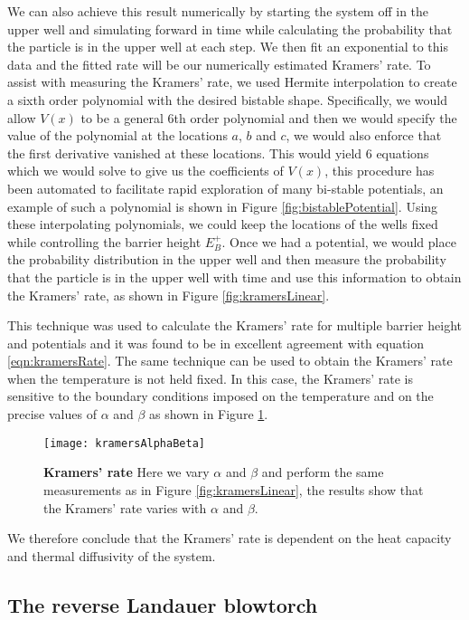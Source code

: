 We can also achieve this result numerically by starting the system off in the upper well and simulating forward in time while calculating the probability that the particle is in the upper well at each step. We then fit an exponential to this data and the fitted rate will be our numerically estimated Kramers' rate. To assist with measuring the Kramers' rate, we used Hermite interpolation to create a sixth order polynomial with the desired bistable shape. Specifically, we would allow $V(x)$ to be a general 6th order polynomial and then we would specify the value of the polynomial at the locations $a$, $b$ and $c$, we would also enforce that the first derivative vanished at these locations. This would yield 6 equations which we would solve to give us the coefficients of $V(x)$, this procedure has been automated to facilitate rapid exploration of many bi-stable potentials, an example of such a polynomial is shown in Figure \ref{fig:bistablePotential}. Using these interpolating polynomials, we could keep the locations of the wells fixed while controlling the barrier height $E_B^+$. Once we had a potential, we would place the probability distribution in the upper well and then measure the probability that the particle is in the upper well with time and use this information to obtain the Kramers' rate, as shown in Figure \ref{fig:kramersLinear}.

This technique was used to calculate the Kramers' rate for multiple barrier height and potentials and it was found to be in excellent agreement with equation \ref{eqn:kramersRate}. The same technique can be used to obtain the Kramers' rate when the temperature is not held fixed. In this case, the Kramers' rate is sensitive to the boundary conditions imposed on the temperature and on the precise values of $\alpha$ and $\beta$ as shown in Figure \ref{fig:kramersAlphaBeta}.

\begin{figure}
	\center
	\texttt{[image: kramersAlphaBeta]}
	\caption{\textbf{Kramers' rate} Here we vary $\alpha$ and $\beta$ and perform the same measurements as in Figure \ref{fig:kramersLinear}, the results show that the Kramers' rate varies with $\alpha$ and $\beta$. \label{fig:kramersAlphaBeta}}
\end{figure}

We therefore conclude that the Kramers' rate is dependent on the heat capacity and thermal diffusivity of the system.

\subsection{The reverse Landauer blowtorch} \label{reverseLandauerBlowtorch}

